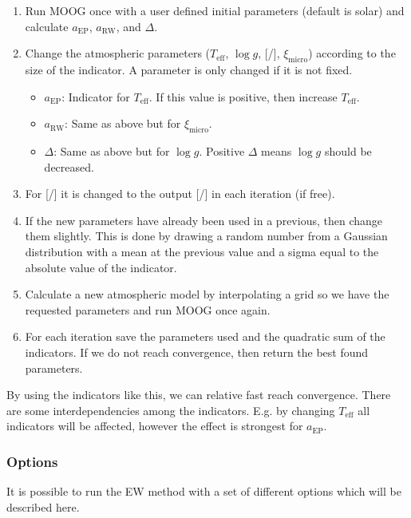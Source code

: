\documentclass{aa}
\begin{document}
\begin{enumerate}
    \item Run MOOG once with a user defined initial parameters (default is
          solar) and calculate $a_\mathrm{EP}$, $a_\mathrm{RW}$, and
          $\Delta$.
    \item Change the atmospheric parameters ($T_\mathrm{eff}$, $\log g$,
          [/], $\xi_\mathrm{micro}$) according to the size of the
          indicator. A parameter is only changed if it is not fixed.
    \begin{itemize}
        \item $a_\mathrm{EP}$: Indicator for $T_\mathrm{eff}$. If this value
              is positive, then increase $T_\mathrm{eff}$.
        \item $a_\mathrm{RW}$: Same as above but for $\xi_\mathrm{micro}$.
        \item $\Delta$: Same as above but for $\log g$. Positive
              $\Delta$ means $\log g$ should be decreased.
    \end{itemize}
    \item For [/] it is changed to the output [/]
          in each iteration (if free).
    \item If the new parameters have already been used in a previous, then
          change them slightly. This is done by drawing a random number from
          a Gaussian distribution with a mean at the previous value and a sigma
          equal to the absolute value of the indicator.
    \item Calculate a new atmospheric model by interpolating a grid so we have
          the requested parameters and run MOOG once again.
    \item For each iteration save the parameters used and the quadratic sum of
          the indicators. If we do not reach convergence, then return the best
          found parameters.
\end{enumerate}

By using the indicators like this, we can relative fast reach convergence.
There are some interdependencies among the indicators. E.g. by changing
$T_\mathrm{eff}$ all indicators will be affected, however the effect is
strongest for $a_\mathrm{EP}$.

\subsubsection{Options}
\label{subs:EWoptions}
It is possible to run the EW method with a set of different options which
will be described here.
\end{document}
